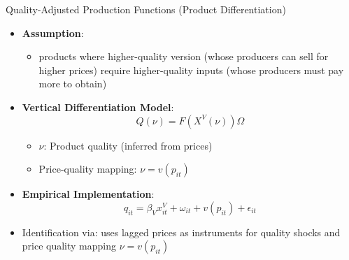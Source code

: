 \documentclass[aspectratio=169]{beamer}  %
\begin{document}
\begin{frame}{Quality-Adjusted Production Functions (Product Differentiation)}
\begin{itemize}
    \item \textbf{Assumption}: 
    \begin{itemize}
        \item products where higher-quality version (whose producers can sell for higher prices) require higher-quality inputs (whose producers must pay more to obtain) 
    \end{itemize}
    \item \textbf{Vertical Differentiation Model}:
    \[
    Q(\nu) = F(X^V(\nu))\Omega
    \]
    \begin{itemize}
        \item $\nu$: Product quality (inferred from prices)
        \item Price-quality mapping: $\nu = v(p_{it})$
    \end{itemize}
    
    \item \textbf{Empirical Implementation}:
    \[
    q_{it} = \beta_V x_{it}^V + \omega_{it} + v(p_{it}) + \epsilon_{it}
    \]
   \item Identification via: uses lagged prices as instruments for quality shocks and price quality mapping $\nu = v(p_{it})$
\end{itemize}
\end{frame}


    
    
\end{document}
